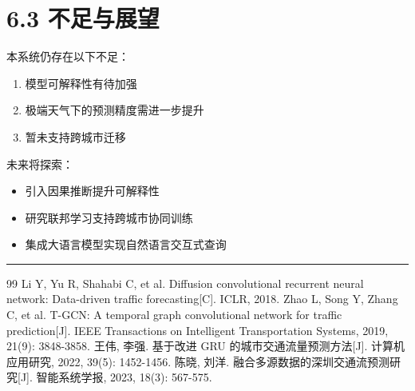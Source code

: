\documentclass{harryopo-report}
\begin{document}
\section*{6.3 不足与展望}

本系统仍存在以下不足：

\begin{enumerate}
  \item 模型可解释性有待加强
  \item 极端天气下的预测精度需进一步提升
  \item 暂未支持跨城市迁移
\end{enumerate}

未来将探索：

\begin{itemize}
  \item 引入因果推断提升可解释性
  \item 研究联邦学习支持跨城市协同训练
  \item 集成大语言模型实现自然语言交互式查询
\end{itemize}

\medskip\hrule\medskip

\begin{thebibliography}{99}
 Li Y, Yu R, Shahabi C, et al. Diffusion convolutional recurrent neural network: Data-driven traffic forecasting[C]. ICLR, 2018.
 Zhao L, Song Y, Zhang C, et al. T-GCN: A temporal graph convolutional network for traffic prediction[J]. IEEE Transactions on Intelligent Transportation Systems, 2019, 21(9): 3848-3858.
 王伟, 李强. 基于改进 GRU 的城市交通流量预测方法[J]. 计算机应用研究, 2022, 39(5): 1452-1456.
 陈晓, 刘洋. 融合多源数据的深圳交通流预测研究[J]. 智能系统学报, 2023, 18(3): 567-575.
\end{thebibliography}
\end{document}
